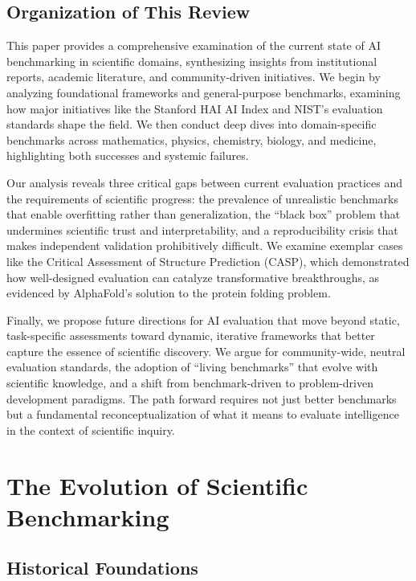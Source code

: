 \documentclass[10pt,twocolumn]{article}
\begin{document}
\subsection{Organization of This Review}

This paper provides a comprehensive examination of the current state of AI benchmarking in scientific domains, synthesizing insights from institutional reports, academic literature, and community-driven initiatives. We begin by analyzing foundational frameworks and general-purpose benchmarks, examining how major initiatives like the Stanford HAI AI Index and NIST's evaluation standards shape the field. We then conduct deep dives into domain-specific benchmarks across mathematics, physics, chemistry, biology, and medicine, highlighting both successes and systemic failures.

Our analysis reveals three critical gaps between current evaluation practices and the requirements of scientific progress: the prevalence of unrealistic benchmarks that enable overfitting rather than generalization, the ``black box'' problem that undermines scientific trust and interpretability, and a reproducibility crisis that makes independent validation prohibitively difficult. We examine exemplar cases like the Critical Assessment of Structure Prediction (CASP), which demonstrated how well-designed evaluation can catalyze transformative breakthroughs, as evidenced by AlphaFold's solution to the protein folding problem.

Finally, we propose future directions for AI evaluation that move beyond static, task-specific assessments toward dynamic, iterative frameworks that better capture the essence of scientific discovery. We argue for community-wide, neutral evaluation standards, the adoption of ``living benchmarks'' that evolve with scientific knowledge, and a shift from benchmark-driven to problem-driven development paradigms. The path forward requires not just better benchmarks but a fundamental reconceptualization of what it means to evaluate intelligence in the context of scientific inquiry.

\section{The Evolution of Scientific Benchmarking}

\subsection{Historical Foundations}
\end{document}
